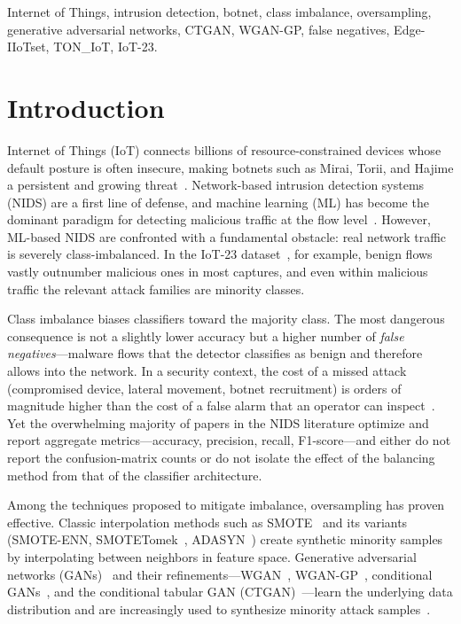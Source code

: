 ﻿\documentclass[journal]{IEEEtran}
\begin{document}
\begin{IEEEkeywords}
Internet of Things, intrusion detection, botnet, class imbalance, oversampling, generative adversarial networks, CTGAN, WGAN-GP, false negatives, Edge-IIoTset, TON\_IoT, IoT-23.
\end{IEEEkeywords}

\section{Introduction}
 Internet of Things (IoT) connects billions of resource-constrained devices whose default posture is often insecure, making botnets such as Mirai, Torii, and Hajime a persistent and growing threat~\cite{frustaci2018iotsecurity,zou2016wireless}. Network-based intrusion detection systems (NIDS) are a first line of defense, and machine learning (ML) has become the dominant paradigm for detecting malicious traffic at the flow level~\cite{khraisat2019survey,ring2019survey}. However, ML-based NIDS are confronted with a fundamental obstacle: real network traffic is severely class-imbalanced. In the IoT-23 dataset~\cite{garcia2020iot23}, for example, benign flows vastly outnumber malicious ones in most captures, and even within malicious traffic the relevant attack families are minority classes.

Class imbalance biases classifiers toward the majority class. The most dangerous consequence is not a slightly lower accuracy but a higher number of \emph{false negatives}---malware flows that the detector classifies as benign and therefore allows into the network. In a security context, the cost of a missed attack (compromised device, lateral movement, botnet recruitment) is orders of magnitude higher than the cost of a false alarm that an operator can inspect~\cite{he2023cwvaegan}. Yet the overwhelming majority of papers in the NIDS literature optimize and report aggregate metrics---accuracy, precision, recall, F1-score---and either do not report the confusion-matrix counts or do not isolate the effect of the balancing method from that of the classifier architecture.

Among the techniques proposed to mitigate imbalance, oversampling has proven effective. Classic interpolation methods such as SMOTE~\cite{chawla2002smote} and its variants (SMOTE-ENN, SMOTETomek~\cite{batista2004smoteenn}, ADASYN~\cite{he2008adasyn}) create synthetic minority samples by interpolating between neighbors in feature space. Generative adversarial networks (GANs)~\cite{goodfellow2014gan} and their refinements---WGAN~\cite{arjovsky2017wgan}, WGAN-GP~\cite{gulrajani2017wgangp}, conditional GANs~\cite{mirza2014cgan}, and the conditional tabular GAN (CTGAN)~\cite{xu2019ctgan}---learn the underlying data distribution and are increasingly used to synthesize minority attack samples~\cite{park2023ainids,habibi2023ctgan,yao2025cwgangp,rahman2024syngan,engelmann2021cwgan}.
\end{document}

